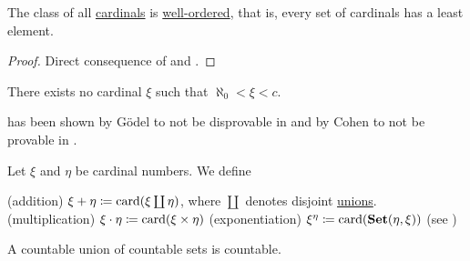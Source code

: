 \begin{proposition}\label{thm:cardinals_well_ordered}
  The class of all \hyperref[def:cardinal]{cardinals} is \hyperref[def:well_ordered_set]{well-ordered}, that is, every set of cardinals has a least element.
\end{proposition}
\begin{proof}
  Direct consequence of  and .
\end{proof}

\begin{conjecture}\label{hyp:continuum_hypothesis}
  There exists no cardinal \( \xi \) such that \( \aleph_0 < \xi < c \).
\end{conjecture}

\medskip

\begin{remark}\label{rem:continuum_hypothesis}
   has been shown by G\"odel to not be disprovable in \hyperref[def:set]{} and by Cohen to not be provable in .
\end{remark}

\begin{definition}\label{def:cardinal_arithmetic}
  Let \( \xi \) and \( \eta \) be cardinal numbers. We define
  \begin{thmenum}
    (addition) \( \xi + \eta \coloneqq \operatorname{card}(\xi \coprod \eta) \), where \( \coprod \) denotes disjoint \hyperref[def:disjoint_union]{unions}.
    (multiplication) \( \xi \cdot \eta \coloneqq \operatorname{card}(\xi \times \eta) \)
    (exponentiation) \( \xi^\eta \coloneqq \operatorname{card}(\operatorname{\mathbf{Set}}(\eta, \xi)) \) (see )
  \end{thmenum}
\end{definition}

\begin{proposition}\label{thm:countable_union_of_countable_sets}
  A countable union of countable sets is countable.
\end{proposition}
